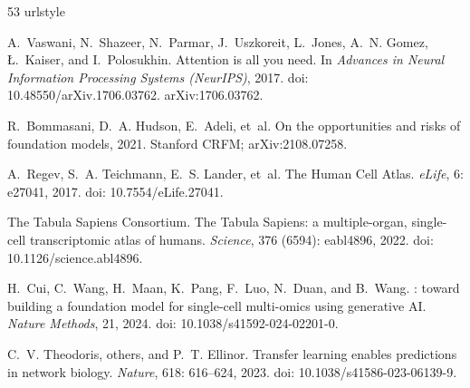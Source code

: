 \documentclass[fleqn,10pt,lineno]{wlpeerj}  %
\begin{document}
\FloatBarrier  %
\begin{thebibliography}{53}
\providecommand{\natexlab}[1]{#1}
\providecommand{\url}[1]{\texttt{#1}}
\expandafter\ifx\csname urlstyle\endcsname\relax
  \providecommand{\doi}[1]{doi: #1}\else
  \providecommand{\doi}{doi: \begingroup \urlstyle{rm}\Url}\fi

A.~Vaswani, N.~Shazeer, N.~Parmar, J.~Uszkoreit, L.~Jones, A.~N. Gomez,
  {\L}.~Kaiser, and I.~Polosukhin.
\newblock Attention is all you need.
\newblock In \emph{Advances in Neural Information Processing Systems
  (NeurIPS)}, 2017.
\newblock \doi{10.48550/arXiv.1706.03762}.
\newblock arXiv:1706.03762.

R.~Bommasani, D.~A. Hudson, E.~Adeli, et~al.
\newblock On the opportunities and risks of foundation models, 2021.
\newblock Stanford CRFM; arXiv:2108.07258.

A.~Regev, S.~A. Teichmann, E.~S. Lander, et~al.
\newblock The {Human Cell Atlas}.
\newblock \emph{eLife}, 6: e27041, 2017.
\newblock \doi{10.7554/eLife.27041}.

{The Tabula Sapiens Consortium}.
\newblock The {Tabula Sapiens}: a multiple-organ, single-cell transcriptomic
  atlas of humans.
\newblock \emph{Science}, 376 (6594): eabl4896, 2022.
\newblock \doi{10.1126/science.abl4896}.

H.~Cui, C.~Wang, H.~Maan, K.~Pang, F.~Luo, N.~Duan, and B.~Wang.
: toward building a foundation model for single-cell
  multi-omics using generative {AI}.
\newblock \emph{Nature Methods}, 21, 2024.
\newblock \doi{10.1038/s41592-024-02201-0}.

C.~V. Theodoris, others, and P.~T. Ellinor.
\newblock Transfer learning enables predictions in network biology.
\newblock \emph{Nature}, 618: 616--624, 2023.
\newblock \doi{10.1038/s41586-023-06139-9}.


\end{thebibliography}
\end{document}
